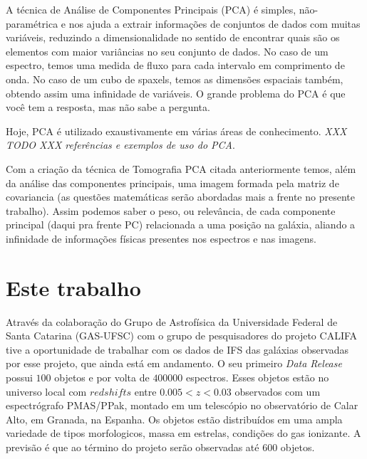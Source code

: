 A técnica de Análise de Componentes Principais (PCA) é simples, não-paramétrica
e nos ajuda a extrair informações de conjuntos de dados com muitas variáveis,
reduzindo a dimensionalidade no sentido de encontrar quais são os elementos com
maior variâncias no seu conjunto de dados. No caso de um espectro, temos uma
medida de fluxo para cada intervalo em comprimento de onda. No caso de um cubo
de spaxels, temos as dimensões espaciais também, obtendo assim uma infinidade de
variáveis. O grande problema do PCA é que você tem a resposta, mas não sabe a
pergunta.

Hoje, PCA é utilizado exaustivamente em várias áreas de conhecimento. {\em XXX
TODO XXX referências e exemplos de uso do PCA}.

Com a criação da técnica de Tomografia PCA citada anteriormente temos, além da
análise das componentes principais, uma imagem formada pela matriz de
covariancia (as questões matemáticas serão abordadas mais a frente no presente
trabalho). Assim podemos saber o peso, ou relevância, de cada componente
principal (daqui pra frente PC) relacionada a uma posição na galáxia, aliando a
infinidade de informações físicas presentes nos espectros e nas imagens.

\section{Este trabalho}
\label{sec:Intro:ThisWork}

Através da colaboração do Grupo de Astrofísica da Universidade Federal de Santa
Catarina (GAS-UFSC) com o grupo de pesquisadores do projeto CALIFA tive a
oportunidade de trabalhar com os dados de IFS das galáxias observadas por esse
projeto, que ainda está em andamento. O seu primeiro {\em Data Release}
\citep{CALIFADR1} possui $100$ objetos e por volta de $400000$ espectros. Esses
objetos estão no universo local com $redshifts$ entre $0.005 < z < 0.03$
observados com um espectrógrafo PMAS/PPak, montado em um telescópio no
observatório de Calar Alto, em Granada, na Espanha. Os objetos estão
distribuídos em uma ampla variedade de tipos morfologicos, massa em
estrelas, condições do gas ionizante. A previsão é que ao término do projeto
serão observadas até $600$ objetos.



